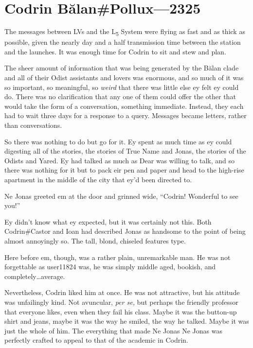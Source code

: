 \hypertarget{codrin-bux103lanpollux-2325}{%
\chapter{Codrin Bălan\#Pollux—2325}\label{codrin-bux103lanpollux-2325}}

The messages between LVs and the L\textsubscript{5} System were flying as fast and as thick as possible, given the nearly day and a half transmission time between the station and the launches. It was enough time for Codrin to sit and stew and plan.

The sheer amount of information that was being generated by the Bălan clade and all of their Odist assistants and lovers was enormous, and so much of it was so important, so meaningful, so \emph{weird} that there was little else ey felt ey could do. There was no clarification that any one of them could offer the other that would take the form of a conversation, something immediate. Instead, they each had to wait three days for a response to a query. Messages became letters, rather than conversations.

So there was nothing to do but go for it. Ey spent as much time as ey could digesting all of the stories, the stories of True Name and Jonas, the stories of the Odists and Yared. Ey had talked as much as Dear was willing to talk, and so there was nothing for it but to pack eir pen and paper and head to the high-rise apartment in the middle of the city that ey'd been directed to.

Ne Jonas greeted em at the door and grinned wide, ``Codrin! Wonderful to see you!''

Ey didn't know what ey expected, but it was certainly not this. Both Codrin\#Castor and Ioan had described Jonas as handsome to the point of being almost annoyingly so. The tall, blond, chiseled features type.

Here before em, though, was a rather plain, unremarkable man. He was not forgettable as user11824 was, he was simply middle aged, bookish, and completely\ldots average.

Nevertheless, Codrin liked him at once. He was not attractive, but his attitude was unfailingly kind. Not avuncular, \emph{per se,} but perhaps the friendly professor that everyone likes, even when they fail his class. Maybe it was the button-up shirt and jeans, maybe it was the way he smiled, the way he talked. Maybe it was just the whole of him. The everything that made Ne Jonas Ne Jonas was perfectly crafted to appeal to that of the academic in Codrin.

